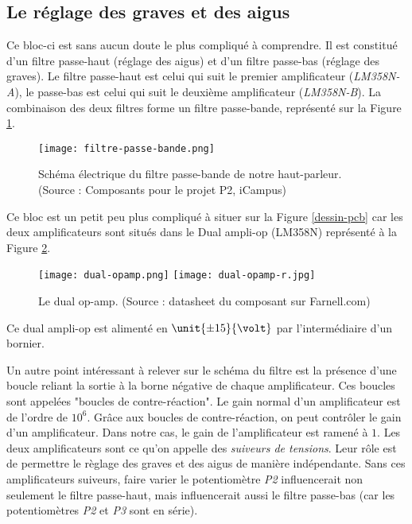 \subsection{Le réglage des graves et des aigus}
Ce bloc-ci est sans aucun doute le plus compliqué à comprendre. Il est constitué d'un 
filtre passe-haut (réglage des aigus) et d'un filtre passe-bas (réglage des graves).
Le filtre passe-haut est celui qui suit le premier amplificateur (\textit{LM358N-A}),
le passe-bas est celui qui suit le deuxième amplificateur (\textit{LM358N-B}). 
La combinaison des deux filtres forme un filtre passe-bande, représenté sur la
Figure \ref{filtre}. 

\begin{figure}[!hbt]
	\centering
	\texttt{[image: filtre-passe-bande.png]}
	\caption{Schéma électrique du filtre passe-bande de notre haut-parleur.
	(Source : Composants pour le projet P2, iCampus)}
	\label{filtre}
\end{figure}

Ce bloc est un petit peu plus compliqué à situer sur la Figure
\ref{dessin-pcb} car les deux amplificateurs sont situés dans le Dual ampli-op (LM358N) 
représenté à la Figure \ref{dual-ampli-op}. 

\begin{figure}[!hbt]
	\centering
	\texttt{[image: dual-opamp.png]}
	\texttt{[image: dual-opamp-r.jpg]}
	\caption{Le dual op-amp. (Source : datasheet du composant sur Farnell.com)}
	\label{dual-ampli-op}
\end{figure}

Ce dual ampli-op est alimenté en $\unit{\pm15}{\volt}$ par l'intermédiaire
d'un bornier.

Un autre point intéressant à relever sur le schéma du filtre est la présence d'une boucle 
reliant la sortie à la borne négative de chaque amplificateur. Ces boucles sont appelées
"boucles de contre-réaction".  Le gain normal d'un amplificateur est de l'ordre de $10^{6}$. 
Grâce aux boucles de contre-réaction, on peut contrôler le gain d'un amplificateur. 
Dans notre cas, le gain de l'amplificateur est ramené à $1$. 
Les deux amplificateurs sont ce qu'on appelle des \textit{suiveurs de tensions}. 
Leur rôle est de permettre le règlage des graves et des aigus de manière indépendante.
Sans ces amplificateurs suiveurs, faire varier le potentiomètre \textit{P2} influencerait 
non seulement le filtre passe-haut, mais influencerait aussi le filtre passe-bas 
(car les potentiomètres \textit{P2} et \textit{P3} sont en série).

